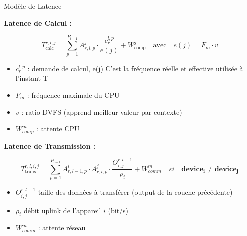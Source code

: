 \documentclass[10pt,aspectratio=169]{beamer}
\begin{document}
\begin{frame}{Modèle de Latence}

\textbf{Latence de Calcul :}

\begin{equation}
T_{\text{calc}}^{r,l,j} = \sum_{p=1}^{P_{l-1}} A^j_{r,l,p} \cdot \frac{c^{l,p}_r}{e(j)} + W_{\text{comp}}^j \quad \text{avec} \quad e(j) = F_m \cdot v 
\end{equation}
\begin{itemize}
\item $c^{l,p}_r$ : demande de calcul, \quad e(j) C'est la fréquence réelle et effective utilisée à l'instant T
\item $F_m$ : fréquence maximale du CPU
\item $v$ : ratio DVFS (apprend meilleur valeur par contexte)
\item $W_{comp}^m$ : attente CPU
\end{itemize}

\vspace{0.1cm}

\textbf{Latence de Transmission :}

\begin{equation}
T_{\text{trans}}^{r,l,i,j} =
\displaystyle
\sum_{p=1}^{P_{l-1}} 
A^i_{r,l-1,p} \cdot A^j_{r,l,p} \cdot 
\frac{O^{r,l-1}_{i,j}}{\rho_i} + W_{comm}^m \quad si \quad \mathbf{device_i} \neq \mathbf{device_j}
\end{equation}
\begin{itemize}
\item $O^{r,l-1}_{i,j}$ \quad taille des données à transférer (output de la couche précédente)
\item $\rho_i$ \quad débit uplink de l'appareil $i$ (bit/s)
\item $W_{comm}^m$ : attente réseau
\end{itemize}

\end{frame}
\end{document}

